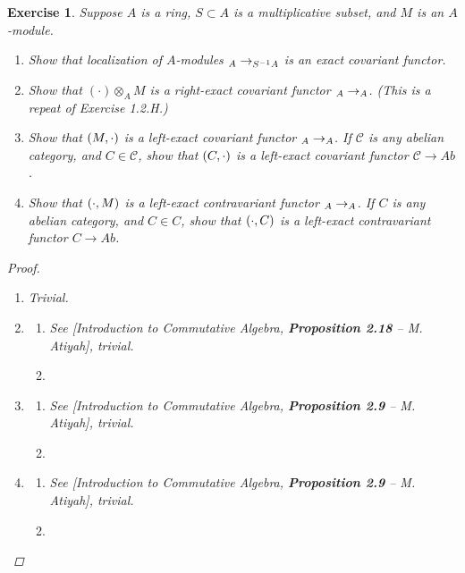 \documentclass{article}
\theoremstyle{breakstyle}
\newtheorem{exercise}{Exercise}[section]
\let\hom\relax
\DeclareMathOperator{\hom}{Hom}
\let\mod\relax
\DeclareMathOperator{\mod}{Mod}
\begin{document}
\begin{exercise}
Suppose $A$ is a ring, $S \subset A$ is a multiplicative subset, and $M$ is
an $A$-module.

\begin{enumerate}[label=({\alph*})]
\item Show that localization of $A$-modules $\mod_{A} \to \mod_{S^{-1}A}$
    is an exact covariant functor.
\item Show that $(\cdot) \otimes_{A} M$ is a right-exact covariant functor
    $\mod_{A} \to \mod_{A}$. (This is a repeat of Exercise 1.2.H.)
\item Show that $\hom(M,\cdot)$ is a left-exact covariant functor
    $\mod_{A} \to \mod_{A}$. If $\mathcal{C}$ is any abelian category, and
    $C \in \mathcal{C}$, show that $\hom(C,\cdot)$ is a left-exact covariant
    functor $\mathcal{C} \to Ab$.
\item Show that $\hom(\cdot, M)$ is a left-exact contravariant functor
    $\mod_{A} \to \mod_{A}$. If $C$ is any abelian category, and
    $C \in C$, show that $\hom(\cdot, C)$ is a left-exact contravariant
    functor $C \to Ab$.
\end{enumerate}

\begin{proof}
    \begin{enumerate}[label=({\alph*})]
        \item 
            Trivial.
        \item \begin{enumerate}[label=({\roman*})]
            \item 
                See \emph{[Introduction to Commutative Algebra,
                \textbf{Proposition 2.18} -- M. Atiyah]}, trivial.
            \item 
            \end{enumerate}
        \item \begin{enumerate}[label=({\roman*})]
            \item 
                See \emph{[Introduction to Commutative Algebra,
                \textbf{Proposition 2.9} -- M. Atiyah]}, trivial.
            \item 
            \end{enumerate}
        \item \begin{enumerate}[label=({\roman*})]
            \item 
                See \emph{[Introduction to Commutative Algebra,
                \textbf{Proposition 2.9} -- M. Atiyah]}, trivial.
            \item 
            \end{enumerate}
    \end{enumerate}
\end{proof}

\end{exercise}
\end{document}
